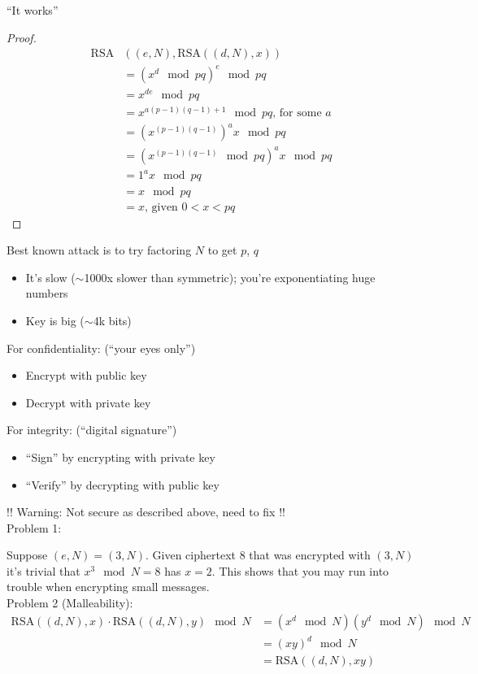 \begin{theorem*}``It works''
\end{theorem*}
\begin{proof}
    \begin{align*}
    \text{RSA}&((e,N), \text{RSA}((d,N), x))\\
    &= (x^d \mod{pq})^e \mod{pq}\\
    &= x^{de} \mod{pq}\\
    &= x^{a(p-1)(q-1)+1} \mod{pq} \text{, for some $a$}\\
    &= (x^{(p-1)(q-1)})^a x \mod{pq}\\
    &= (x^{(p-1)(q-1)} \mod{pq})^a x \mod{pq}\\
    &= 1^a x \mod{pq}\\
    &= x \mod{pq}\\
    &= x \text{, given $0 < x < pq$}
    \end{align*}
\end{proof}
Best known attack is to try factoring $N$ to get $p$, $q$
\begin{itemize}
    \item It's slow ($\sim$1000x slower than symmetric); you're exponentiating huge numbers
    \item Key is big ($\sim$4k bits)
\end{itemize}
For confidentiality: (``your eyes only'')
\begin{itemize}
    \item Encrypt with public key
    \item Decrypt with private key
\end{itemize}
For integrity: (``digital signature'')
\begin{itemize}
    \item ``Sign'' by encrypting with private key
    \item ``Verify'' by decrypting with public key
\end{itemize}
!! Warning: Not secure as described above, need to fix !!\\

Problem 1:

Suppose $(e, N) = (3, N)$. Given ciphertext $8$ that was encrypted with $(3, N)$
it's trivial that $x^3 \mod N =8$ has $x = 2$. This shows that you may run into
trouble when encrypting small messages.\\

Problem 2 (Malleability):
\begin{align*}
\text{RSA}((d,N),x) \cdot \text{RSA}((d,N),y) \mod N &= (x^d \mod N)(y^d \mod N) \mod N\\
&= (xy)^d \mod N\\
&= \text{RSA}((d,N), xy)
\end{align*}

